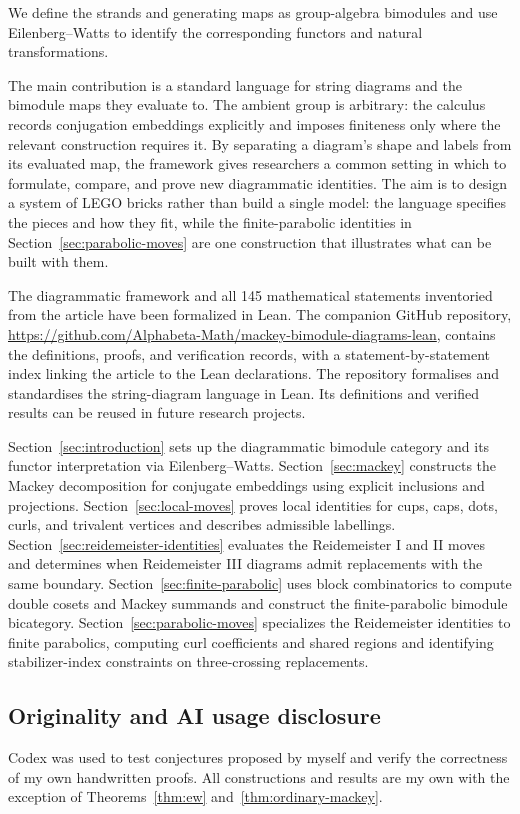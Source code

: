 \documentclass[11pt,a4paper]{article}
\numberwithin{equation}{section}
\theoremstyle{definition}
\begin{document}
We define the strands and generating maps as group-algebra bimodules
and use Eilenberg--Watts to identify the corresponding functors and
natural transformations.

The main contribution is a standard language for string diagrams and
the bimodule maps they evaluate to. The ambient group is arbitrary:
the calculus records conjugation embeddings explicitly and imposes
finiteness only where the relevant construction requires it. By
separating a diagram's shape and labels from its evaluated map, the
framework gives researchers a common setting in which to formulate,
compare, and prove new diagrammatic identities. The aim is to design a
system of LEGO bricks rather than build a single model: the language
specifies the pieces and how they fit, while the finite-parabolic
identities in Section~\ref{sec:parabolic-moves} are one construction
that illustrates what can be built with them.

The diagrammatic framework and all 145 mathematical statements
inventoried from the article have been formalized in Lean. The
companion GitHub repository,
\url{https://github.com/Alphabeta-Math/mackey-bimodule-diagrams-lean},
contains the definitions, proofs, and verification records, with a
statement-by-statement index linking the article to the Lean declarations.
The repository formalises and standardises the string-diagram language
in Lean. Its definitions and verified results can be reused in future
research projects.

Section~\ref{sec:introduction} sets up the diagrammatic bimodule
category and its functor interpretation via Eilenberg--Watts.
Section~\ref{sec:mackey} constructs the Mackey decomposition for
conjugate embeddings using explicit inclusions and projections.
Section~\ref{sec:local-moves} proves local identities for cups, caps,
dots, curls, and trivalent vertices and describes admissible labellings.
Section~\ref{sec:reidemeister-identities} evaluates the Reidemeister I
and II moves and determines when Reidemeister III diagrams admit
replacements with the same boundary.
Section~\ref{sec:finite-parabolic} uses block combinatorics to compute
double cosets and Mackey summands and construct the finite-parabolic
bimodule bicategory.
Section~\ref{sec:parabolic-moves} specializes the Reidemeister identities
to finite parabolics, computing curl coefficients and shared regions
and identifying stabilizer-index constraints on three-crossing replacements.

\subsection*{Originality and AI usage disclosure}
Codex was used to test conjectures proposed by myself and verify the
correctness of my own handwritten proofs. All constructions and results
are my own with the exception of Theorems~\ref{thm:ew} and~\ref{thm:ordinary-mackey}.
\end{document}
